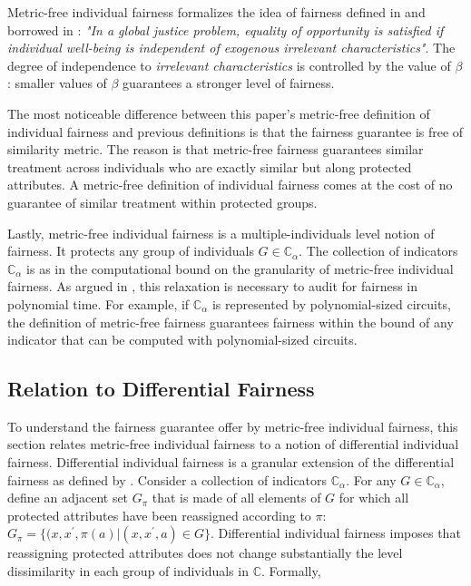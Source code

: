 \documentclass{article}
\begin{document}
Metric-free individual fairness formalizes the idea of fairness defined in \cite{calsamiglia2009decentralizing} and borrowed in \cite{dwork2012fairness}: \textit{"In a global justice problem, equality of opportunity is satisfied if individual well-being is 
independent of exogenous irrelevant characteristics"}. The degree of independence to \textit{irrelevant characteristics} is controlled by the value of $\beta$: smaller values of $\beta$ guarantees a stronger level of fairness. 

\bigskip
The most noticeable difference between this paper's metric-free definition of individual fairness and previous definitions is that the fairness guarantee is free of similarity metric. The reason is that metric-free fairness guarantees similar treatment across individuals who are exactly similar but along protected attributes. A metric-free definition of individual fairness comes at the cost of no guarantee of similar treatment within protected groups.

\bigskip
 Lastly, metric-free individual fairness is a multiple-individuals level notion of fairness. It protects any group of individuals $G\in \mathbb{C}_{\alpha}$. The collection of indicators $\mathbb{C}_{\alpha}$ is as in \cite{kim2018fairness} the computational bound on the granularity of metric-free individual fairness. As argued in \cite{kim2018fairness}, this relaxation is necessary to audit for fairness in polynomial time. For example, if $\mathbb{C}_{\alpha}$ is represented by polynomial-sized circuits, the definition of metric-free fairness guarantees fairness within the bound of any indicator that can be computed with polynomial-sized circuits.
 
 
 \subsection{Relation to Differential Fairness}
 To understand the fairness guarantee offer by  metric-free individual fairness, this section relates metric-free individual fairness to a notion of differential individual fairness. Differential individual fairness is a granular extension of the differential fairness as defined by \cite{Foulds2018}. Consider a collection of indicators $\mathbb{C}_{\alpha}$. For any $G\in \mathbb{C}_{\alpha}$, define an adjacent set $G_{\pi}$ that is made of all elements of $G$ for which all protected attributes have been reassigned according to $\pi$: $G_{\pi}=\{(x, x^{'}, \pi(a)| (x, x^{'}, a) \in G\}$. Differential individual fairness imposes that reassigning protected attributes does not change substantially the 
 level dissimilarity in each group of individuals in $\mathbb{C}$. Formally, 
 
\end{document}

